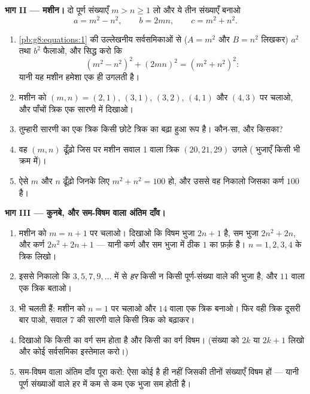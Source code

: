 \begin{problem}[{सप्ताहांत समस्या --- पूर्ण संख्याओं वाले समकोण
त्रिभुज, और वह सर्वसमिका
$(m^2 - n^2)^2 + (2mn)^2 = (m^2 + n^2)^2$ जो उन सबको बना देती है}]
\medskip
\noindent\textbf{भाग II --- मशीन।}
दो पूर्ण संख्याएँ $m > n \geq 1$ लो और ये तीन संख्याएँ बनाओ
\[
a = m^2 - n^2,
\qquad
b = 2mn,
\qquad
c = m^2 + n^2 .
\]
\begin{enumerate}[resume]
  \item \cref{pb:g8:equations:1} की उल्लेखनीय सर्वसमिकाओं से
        ($A = m^2$ और $B = n^2$ लिखकर) $a^2$ तथा $b^2$ फैलाओ, और
        सिद्ध करो कि
        \[
        \left(m^2 - n^2\right)^2 + (2mn)^2
        = \left(m^2 + n^2\right)^2 :
        \]
        यानी यह मशीन हमेशा एक  ही उगलती है।
  \item मशीन को $(m, n) = (2, 1)$, $(3, 1)$, $(3, 2)$, $(4, 1)$
        और $(4, 3)$ पर चलाओ, और पाँचों त्रिक एक सारणी में दिखाओ।
  \item तुम्हारी सारणी का एक त्रिक किसी छोटे त्रिक का बढ़ा हुआ रूप
        है। कौन-सा, और किसका?
  \item वह $(m, n)$ ढूँढ़ो जिस पर मशीन सवाल 1 वाला त्रिक
        $(20, 21, 29)$ उगले ( भुजाएँ किसी भी क्रम में)।
  \item ऐसे $m$ और $n$ ढूँढ़ो जिनके लिए $m^2 + n^2 = 100$ हो, और
        उससे वह  निकालो जिसका कर्ण $100$ है।
\end{enumerate}

\medskip
\noindent\textbf{भाग III --- कुनबे, और सम-विषम वाला अंतिम दाँव।}
\begin{enumerate}[resume]
  \item मशीन को $m = n + 1$ पर चलाओ। दिखाओ कि विषम  भुजा
        $2n + 1$ है, सम  भुजा $2n^2 + 2n$, और कर्ण
        $2n^2 + 2n + 1$ --- यानी कर्ण और सम  भुजा में ठीक $1$
        का फ़र्क़ है। $n = 1, 2, 3, 4$ के त्रिक लिखो।
  \item इससे निकालो कि $3, 5, 7, 9, \dots$ में से \emph{हर}  किसी न किसी पूर्ण-संख्या वाले  की भुजा
        है, और $11$ वाला एक त्रिक बताओ।
  \item {} भी चलती हैं: मशीन को $n = 1$ पर चलाओ और $14$
        वाला एक त्रिक बनाओ। फिर वही त्रिक दूसरी बार पाओ, सवाल 7 की
        सारणी वाले किसी त्रिक को बढ़ाकर।
  \item दिखाओ कि किसी  का वर्ग सम होता है और किसी  का वर्ग विषम। (संख्या को $2k$ या $2k + 1$ लिखो और
        कोई सर्वसमिका इस्तेमाल करो।)
  \item सम-विषम वाला अंतिम दाँव पूरा करो: ऐसा कोई 
        है ही नहीं जिसकी तीनों संख्याएँ विषम हों --- यानी पूर्ण
        संख्याओं वाले हर  में कम से कम एक भुजा सम
        होती है।
\end{enumerate}
\end{problem}
